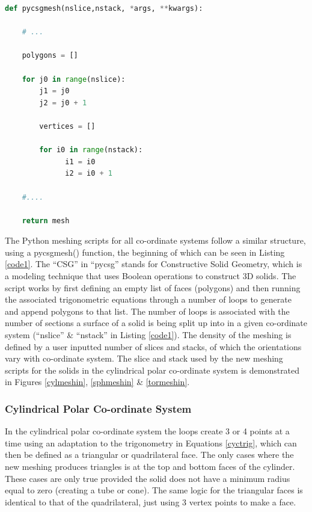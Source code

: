 \documentclass[12pt,a4paper]{article}
\begin{document}
\begin{lstlisting}[language=Python, label=code1, caption=Basic Python script structure for new meshing of primitive solid in Pyg4ometry.]
def pycsgmesh(nslice,nstack, *args, **kwargs):

    # ... 
    
    polygons = []

    for j0 in range(nslice):
        j1 = j0
        j2 = j0 + 1
    
        vertices = []

        for i0 in range(nstack):
              i1 = i0
              i2 = i0 + 1     
              
    #....
    
    return mesh

\end{lstlisting}

\newpage
\noindent The Python meshing scripts for all co-ordinate systems follow a similar structure, using a pycsgmesh() function, the beginning of which can be seen in Listing \ref{code1}. The ``CSG'' in ``pycsg'' stands for Constructive Solid Geometry, which is a  modeling technique that uses Boolean operations to construct 3D solids. The script works by  first defining an empty list of faces (polygons) and then running the associated trigonometric equations through a number of loops to generate and append polygons to that list. The number of loops is associated with the number of sections a surface of a solid is being split up into in a given co-ordinate system (``nslice'' \& ``nstack'' in Listing \ref{code1}). The density of the meshing is defined by a user inputted number of slices and stacks, of which the orientations vary with co-ordinate system. The slice and stack used by the new meshing scripts for the solids in the cylindrical polar co-ordinate system is demonstrated in Figures \ref{cylmeshin}, \ref{sphmeshin} \& \ref{tormeshin}.

\subsubsection{Cylindrical Polar Co-ordinate System}
\label{cycl}
In the cylindrical polar co-ordinate system the loops create 3 or 4 points at a time using an adaptation to the trigonometry in Equations \ref{cyctrig}, which can then be defined as a triangular or quadrilateral face. The only cases where the new meshing produces triangles is at the top and bottom faces of the cylinder. These cases are only true provided the solid does not have a minimum radius equal to zero (creating a tube or cone). The same logic for the triangular faces is identical to that of the quadrilateral, just using 3 vertex points to make a face.
\end{document}
